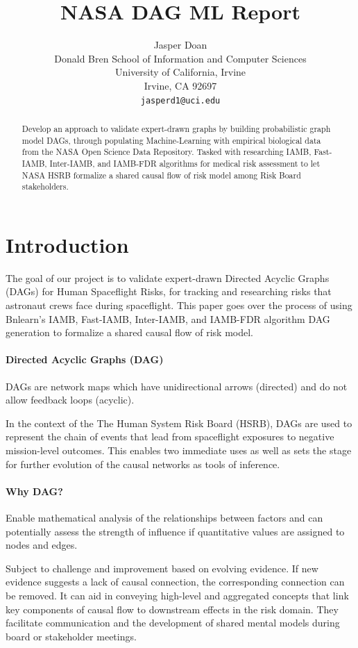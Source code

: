 \documentclass{article}
\title{NASA DAG ML Report}
\author{
  Jasper Doan \\
  Donald Bren School of Information and Computer Sciences\\
  University of California, Irvine\\
  Irvine, CA 92697 \\
  \texttt{jasperd1@uci.edu} \\
}
\begin{document}
\maketitle
\begin{abstract}
Develop an approach to validate expert-drawn graphs by building probabilistic graph model DAGs, through populating Machine-Learning with empirical biological data from the NASA Open Science Data Repository. Tasked with researching IAMB, Fast-IAMB, Inter-IAMB, and IAMB-FDR algorithms for medical risk assessment to let NASA HSRB formalize a shared causal flow of risk model among Risk Board stakeholders. 
\end{abstract}




\section{Introduction}
The goal of our project is to validate expert-drawn Directed Acyclic Graphs (DAGs) for Human Spaceflight Risks, for tracking and researching risks that astronaut crews face during spaceflight.
This paper goes over the process of using Bnlearn's IAMB, Fast-IAMB, Inter-IAMB, and IAMB-FDR algorithm DAG generation to formalize a shared causal flow of risk model.

\paragraph{Directed Acyclic Graphs (DAG)}
DAGs are network maps which have unidirectional arrows (directed) and do not allow feedback loops (acyclic). 

In the context of the The Human System Risk Board (HSRB), DAGs are used to represent the chain of events that lead from spaceflight exposures to negative mission-level outcomes. This enables two immediate uses as well as sets the stage for further evolution of the causal networks as tools of inference.

\paragraph{Why DAG?}
Enable mathematical analysis of the relationships between factors and can potentially assess the strength of influence if quantitative values are assigned to nodes and edges.

Subject to challenge and improvement based on evolving evidence. If new evidence suggests a lack of causal connection, the corresponding connection can be removed.
It can aid in conveying high-level and aggregated concepts that link key components of causal flow to downstream effects in the risk domain.
They facilitate communication and the development of shared mental models during board or stakeholder meetings.
\end{document}
